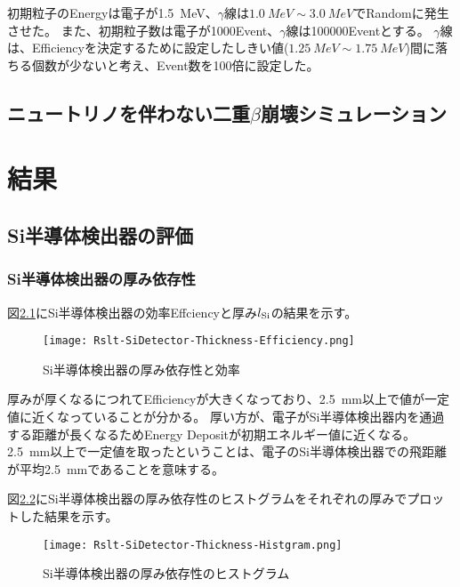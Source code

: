 \documentclass[a4paper,10pt]{jreport}
\begin{document}
初期粒子のEnergyは電子が\SI{1.5}{MeV}、$\gamma$線は$\SI{1.0}{MeV}\sim\SI{3.0}{MeV}$でRandomに発生させた。
また、初期粒子数は電子が1000Event、$\gamma$線は100000Eventとする。
$\gamma$線は、Efficiencyを決定するために設定したしきい値($\SI{1.25}{MeV}\sim\SI{1.75}{MeV}$)間に落ちる個数が少ないと考え、Event数を100倍に設定した。


\section{ニュートリノを伴わない二重$\beta$崩壊シミュレーション}



\chapter{結果}



\section{Si半導体検出器の評価}

\subsection{Si半導体検出器の厚み依存性}

図\ref{Rslt-SiDetector-Thickness-Efficiency}にSi半導体検出器の効率Effciencyと厚み$l_{\rm{Si}}$の結果を示す。

\begin{figure}[H]
	\center
	\texttt{[image: Rslt-SiDetector-Thickness-Efficiency.png]}
	\caption{Si半導体検出器の厚み依存性と効率} \label{Rslt-SiDetector-Thickness-Efficiency}
\end{figure}

厚みが厚くなるにつれてEfficiencyが大きくなっており、\SI{2.5}{mm}以上で値が一定値に近くなっていることが分かる。
厚い方が、電子がSi半導体検出器内を通過する距離が長くなるためEnergy Depositが初期エネルギー値に近くなる。
\SI{2.5}{mm}以上で一定値を取ったということは、電子のSi半導体検出器での飛距離が平均\SI{2.5}{mm}であることを意味する。

図\ref{Rslt-SiDetector-Thickness-Histgram}にSi半導体検出器の厚み依存性のヒストグラムをそれぞれの厚みでプロットした結果を示す。

\begin{figure}[H]
	\center
	\texttt{[image: Rslt-SiDetector-Thickness-Histgram.png]}
	\caption{Si半導体検出器の厚み依存性のヒストグラム} \label{Rslt-SiDetector-Thickness-Histgram}
\end{figure}
\end{document}
